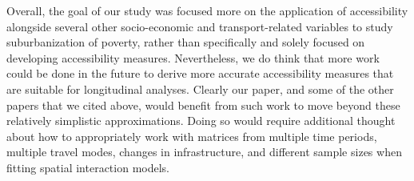 Overall, the goal of our study was focused more on the application of accessibility alongside several other socio-economic and transport-related variables to study suburbanization of poverty, rather than specifically and solely focused on developing accessibility measures. Nevertheless, we do think that more work could be done in the future to derive more accurate accessibility measures that are suitable for longitudinal analyses. Clearly our paper, and some of the other papers that we cited above, would benefit from such work to move beyond these relatively simplistic approximations. Doing so would require additional thought about how to appropriately work with matrices from multiple time periods, multiple travel modes, changes in infrastructure, and different sample sizes when fitting spatial interaction models.

